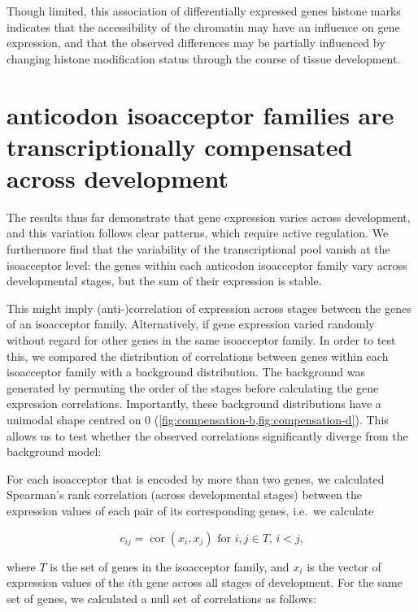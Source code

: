 Though limited, this association of differentially expressed \trna genes histone
marks indicates that the accessibility of the chromatin may have an influence on
\trna gene expression, and that the observed differences may be partially
influenced by changing histone modification status through the course of tissue
development.

\section{ anticodon isoacceptor families are transcriptionally
compensated across development}

The results thus far demonstrate that \trna gene expression varies across
development, and this variation follows clear patterns, which require active
regulation. We furthermore find that the variability of the transcriptional
\trna pool vanish at the isoacceptor level: the \trna genes within each
anticodon isoacceptor family vary across developmental stages, but the sum of
their expression is stable.

This might imply (anti-)correlation of expression across stages between the
genes of an isoacceptor family. Alternatively, if \trna gene expression varied
randomly without regard for other \trna genes in the same isoacceptor family. In
order to test this, we compared the distribution of correlations between genes
within each isoacceptor family with a background distribution. The
background was generated by permuting the order of the stages before calculating
the \trna gene expression correlations. Importantly, these background
distributions have a unimodal shape centred on \num{0}
(\cref{fig:compensation-b,fig:compensation-d}). This allows us to test whether
the observed correlations significantly diverge from the background model:

For each isoacceptor that is encoded by more than two \trna genes, we calculated
Spearman’s rank correlation (across developmental stages) between the expression
values of each pair of its corresponding \trna genes, i.e.\ we calculate

\begin{equation}
    c_{ij} = \operatorname{cor}(x_i, x_j) \text{\ for \(i, j \in T\),
        \(i < j\),}
\end{equation}

where \(T\) is the set of \trna genes in the isoacceptor family, and \(x_i\) is
the vector of expression values of the \(i\)th \trna gene across all stages of
development. For the same set of genes, we calculated a null set of correlations
as follows:

